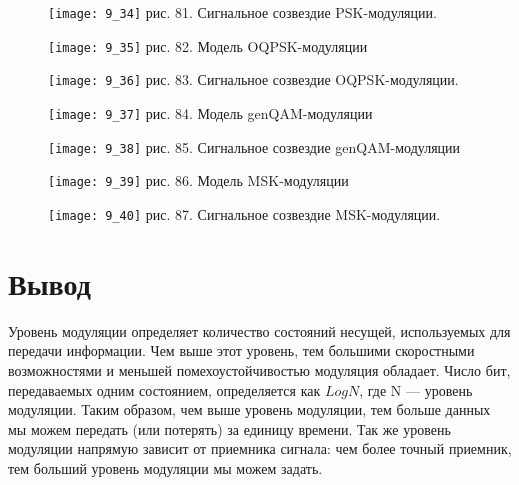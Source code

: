\documentclass[10pt,a4paper]{report}
\begin{document}
\begin{figure}
\begin{center}
\texttt{[image: 9\_34]}\newline
рис. 81. Сигнальное созвездие PSK-модуляции.\newline
\end{center}
\end{figure}
\begin{figure}
\begin{center}
\texttt{[image: 9\_35]}\newline
рис. 82. Модель OQPSK-модуляции\newline
\end{center}
\end{figure}
\begin{figure}
\begin{center}
\texttt{[image: 9\_36]}\newline
рис. 83. Сигнальное созвездие OQPSK-модуляции.\newline
\end{center}
\end{figure}
\begin{figure}
\begin{center}
\texttt{[image: 9\_37]}\newline
рис. 84. Модель genQAM-модуляции\newline
\end{center}
\end{figure}
\begin{figure}
\begin{center}
\texttt{[image: 9\_38]}\newline
рис. 85. Сигнальное созвездие genQAM-модуляции\newline
\end{center}
\end{figure}
\begin{figure}
\begin{center}
\texttt{[image: 9\_39]}\newline
рис. 86. Модель MSK-модуляции\newline
\end{center}
\end{figure}
\begin{figure}
\begin{center}
\texttt{[image: 9\_40]}\newline
рис. 87. Сигнальное созвездие MSK-модуляции.\newline
\end{center}
\end{figure}
\section{Вывод}
Уровень модуляции определяет количество состояний несущей, используемых для передачи информации. Чем выше этот уровень, тем большими скоростными возможностями и меньшей помехоустойчивостью модуляция обладает. Число бит, передаваемых одним состоянием, определяется как $Log N$, где N — уровень модуляции. Таким образом, чем выше уровень модуляции, тем больше данных мы можем передать (или потерять) за единицу времени. Так же уровень модуляции напрямую зависит от приемника сигнала: чем более точный приемник, тем больший уровень модуляции мы можем задать.
\end{document}

